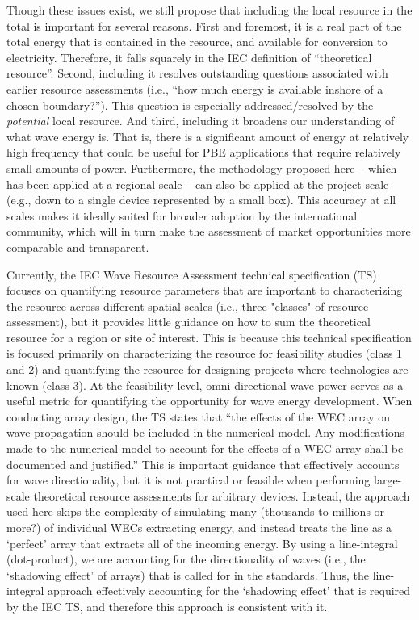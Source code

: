 Though these issues exist, we still propose that including the local resource in the total is important for several reasons. First and foremost, it is a real part of the total energy that is contained in the resource, and available for conversion to electricity. Therefore, it falls squarely in the IEC definition of ``theoretical resource''. Second, including it resolves outstanding questions associated with earlier resource assessments (i.e., ``how much energy is available inshore of a chosen boundary?''). This question is especially addressed/resolved by the {\em potential} local resource. And third, including it broadens our understanding of what wave energy is. That is, there is a significant amount of energy at relatively high frequency that could be useful for PBE applications that require relatively small amounts of power. Furthermore, the methodology proposed here -- which has been applied at a regional scale -- can also be applied at the project scale (e.g., down to a single device represented by a small box).
This accuracy at all scales makes it ideally suited for broader adoption by the international community, which will in turn make the assessment of market opportunities more comparable and transparent.

Currently, the IEC Wave Resource Assessment technical specification (TS) focuses on quantifying resource parameters that are important to characterizing the resource across different spatial scales (i.e., three "classes" of resource assessment), but it provides little guidance on how to sum the theoretical resource for a region or site of interest. This is because this technical specification is focused primarily on characterizing the resource for feasibility studies (class 1 and 2) and quantifying the resource for designing projects where technologies are known (class 3). At the feasibility level, omni-directional wave power serves as a useful metric for quantifying the opportunity for wave energy development. When conducting array design, the TS states that ``the effects of the WEC array on wave propagation should be included in the numerical model. Any modifications made to the numerical model to account for the effects of a WEC array shall be documented and justified.'' This is important guidance that effectively accounts for wave directionality, but it is not practical or feasible when performing large-scale theoretical resource assessments for arbitrary devices. Instead, the approach used here skips the complexity of simulating many (thousands to millions or more?) of individual WECs extracting energy, and instead treats the line as a `perfect' array that extracts all of the incoming energy. By using a line-integral (dot-product), we are accounting for the directionality of waves (i.e., the `shadowing effect' of arrays) that is called for in the standards. Thus, the line-integral approach effectively accounting for the `shadowing effect' that is required by the IEC TS, and therefore this approach is consistent with it.

